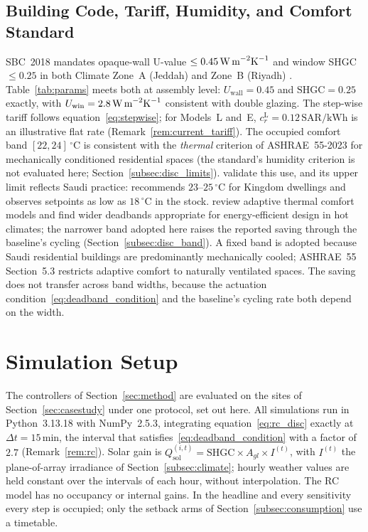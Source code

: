 \documentclass[pdflatex,sn-mathphys-num,iicol]{sn-jnl}
\theoremstyle{thmstyleone}\newtheorem{proposition}{Proposition}\newtheorem{corollary}{Corollary}
\theoremstyle{thmstyletwo}\newtheorem{remark}{Remark}\newtheorem{observation}{Observation}
\theoremstyle{thmstylethree}\newtheorem{definition}{Definition}
\newcommand{\SAR}{\text{SAR}}
\newcommand{\kWh}{\text{kWh}}
\begin{document}
 
\subsection{Building Code, Tariff, Humidity, and Comfort Standard}
\label{subsec:sbc}
 
SBC~2018 mandates opaque-wall U-value $\le0.45\,\text{W\,m}^{-2}\text{K}^{-1}$ and window SHGC $\le0.25$ in both Climate Zone~A (Jeddah) and Zone~B (Riyadh) \citep{Alayed2021}. Table~\ref{tab:params} meets both at assembly level: $U_{\mathrm{wall}}=0.45$ and $\mathrm{SHGC}=0.25$ exactly, with $U_{\mathrm{win}}=2.8\,\text{W\,m}^{-2}\text{K}^{-1}$ consistent with double glazing. The step-wise tariff follows equation~\eqref{eq:stepwise}; for Models~L and~E, $c_r^{\mathrm{L}}=0.12\,\SAR/\kWh$ is an illustrative flat rate (Remark~\ref{rem:current_tariff}). The occupied comfort band $[22,24]\,^\circ$C is consistent with the \emph{thermal} criterion of ASHRAE~55-2023 \citep{ASHRAE55_2023} for mechanically conditioned residential spaces (the standard's humidity criterion is not evaluated here; Section~\ref{subsec:disc_limits}). \citet{Bienvenido2024} validate this use, and its upper limit reflects Saudi practice: \citet{Krarti2020occ} recommends $23$--$25\,^\circ$C for Kingdom dwellings and observes setpoints as low as $18\,^\circ$C in the stock. \citet{Lamsal2023} review adaptive thermal comfort models and find wider deadbands appropriate for energy-efficient design in hot climates; the narrower band adopted here raises the reported saving through the baseline's cycling (Section~\ref{subsec:disc_band}). A fixed band is adopted because Saudi residential buildings are predominantly mechanically cooled; ASHRAE~55 Section~5.3 restricts adaptive comfort to naturally ventilated spaces. The saving does not transfer across band widths, because the actuation condition~\eqref{eq:deadband_condition} and the baseline's cycling rate both depend on the width.
 
 
\section{Simulation Setup}
\label{sec:sim}
 
The controllers of Section~\ref{sec:method} are evaluated on the sites of Section~\ref{sec:casestudy} under one protocol, set out here. All simulations run in Python~3.13.18 with NumPy~2.5.3, integrating equation~\eqref{eq:rc_disc} exactly at $\Delta t=15\,$min, the interval that satisfies~\eqref{eq:deadband_condition} with a factor of $2.7$ (Remark~\ref{rem:rc}). Solar gain is $Q_{\mathrm{sol}}^{(i,t)}=\text{SHGC}\times A_{gl}\times I^{(t)}$, with $I^{(t)}$ the plane-of-array irradiance of Section~\ref{subsec:climate}; hourly weather values are held constant over the intervals of each hour, without interpolation. The RC model has no occupancy or internal gains. In the headline and every sensitivity every step is occupied; only the setback arms of Section~\ref{subsec:consumption} use a timetable.
\end{document}
